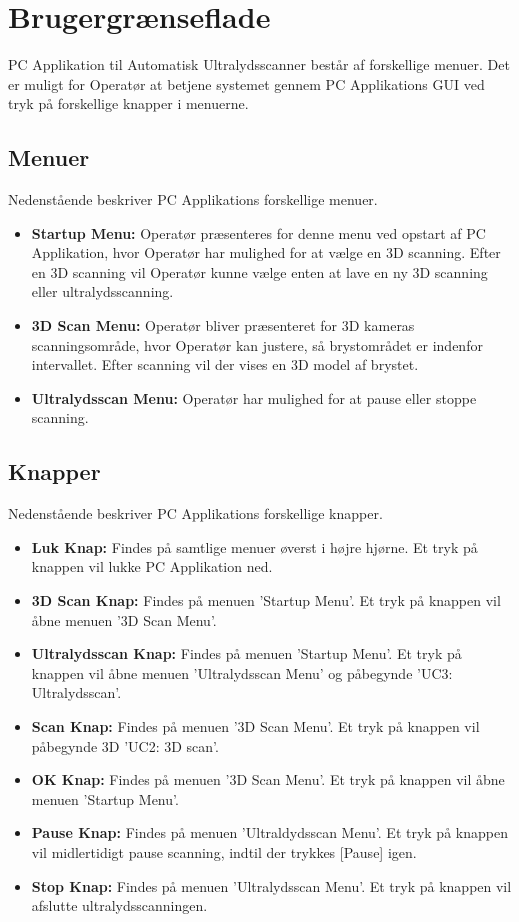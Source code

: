 \chapter{Brugergrænseflade}\label{Brugerganseflade}

PC Applikation til Automatisk Ultralydsscanner består af forskellige menuer.  Det er muligt for Operatør at betjene systemet gennem PC Applikations GUI ved tryk på forskellige knapper i menuerne. 

\section{Menuer}
Nedenstående beskriver PC Applikations forskellige menuer. 
\begin{itemize}
\item \textbf{Startup Menu:} Operatør præsenteres for denne menu ved opstart af PC Applikation, hvor Operatør har mulighed for at vælge en 3D scanning. Efter en 3D scanning vil Operatør kunne vælge enten at lave en ny 3D scanning eller ultralydsscanning. 
\item \textbf{3D Scan Menu: } Operatør bliver præsenteret for 3D kameras scanningsområde, hvor Operatør kan justere, så brystområdet er indenfor intervallet. Efter scanning vil der vises en 3D model af brystet. 
\item \textbf{Ultralydsscan Menu:} Operatør har mulighed for at pause eller stoppe scanning. 
\end{itemize}

\section{Knapper}
Nedenstående beskriver PC Applikations forskellige knapper. 
\begin{itemize}
\item \textbf{Luk Knap:} Findes på samtlige menuer øverst i højre hjørne. Et tryk på knappen vil lukke PC Applikation ned. 
\item \textbf{3D Scan Knap:} Findes på menuen 'Startup Menu'. Et tryk på knappen vil åbne menuen '3D Scan Menu'. 
\item \textbf{Ultralydsscan Knap:} Findes på menuen 'Startup Menu'. Et tryk på knappen vil åbne menuen 'Ultralydsscan Menu' og påbegynde 'UC3: Ultralydsscan'. 
\item \textbf{Scan Knap:} Findes på menuen '3D Scan Menu'. Et tryk på knappen vil påbegynde 3D 'UC2: 3D scan'. 
\item \textbf{OK Knap:} Findes på menuen '3D Scan Menu'. Et tryk på knappen vil åbne menuen 'Startup Menu'. 
\item \textbf{Pause Knap:} Findes på menuen 'Ultraldydsscan Menu'. Et tryk på knappen vil midlertidigt pause scanning, indtil der trykkes [Pause] igen. 
\item \textbf{Stop Knap:} Findes på menuen 'Ultralydsscan Menu'. Et tryk på knappen vil afslutte ultralydsscanningen. 
\end{itemize}

